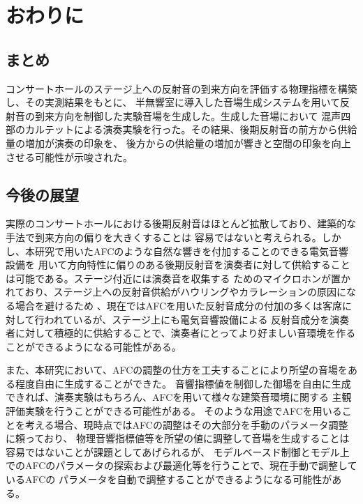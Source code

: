 \documentclass[11pt,a4j]{jreport}
\begin{document}
\chapter{おわりに}


\section{まとめ}

コンサートホールのステージ上への反射音の到来方向を評価する物理指標を構築し、その実測結果をもとに、
半無響室に導入した音場生成システムを用いて反射音の到来方向を制御した実験音場を生成した。生成した音場において
混声四部のカルテットによる演奏実験を行った。その結果、後期反射音の前方から供給量の増加が演奏の印象を、
後方からの供給量の増加が響きと空間の印象を向上させる可能性が示唆された。


\section{今後の展望}
実際のコンサートホールにおける後期反射音はほとんど拡散しており、建築的な手法で到来方向の偏りを大きくすることは
容易ではないと考えられる。しかし、本研究で用いたAFCのような自然な響きを付加することのできる電気音響設備を
用いて方向特性に偏りのある後期反射音を演奏者に対して供給することは可能である。ステージ付近には演奏音を収集する
ためのマイクロホンが置かれており、ステージ上への反射音供給がハウリングやカラレーションの原因になる場合を避けるため
、現在ではAFCを用いた反射音成分の付加の多くは客席に対して行われているが、ステージ上にも電気音響設備による
反射音成分を演奏者に対して積極的に供給することで、演奏者にとってより好ましい音環境を作ることができるようになる可能性がある。

また、本研究において、AFCの調整の仕方を工夫することにより所望の音場をある程度自由に生成することができた。
音響指標値を制御した御場を自由に生成できれば、演奏実験はもちろん、AFCを用いて様々な建築音環境に関する
主観評価実験を行うことができる可能性がある。
そのような用途でAFCを用いることを考える場合、現時点ではAFCの調整はその大部分を手動のパラメータ調整に頼っており、
物理音響指標値等を所望の値に調整して音場を生成することは容易ではないことが課題としてあげられるが、
モデルベースド制御とモデル上でのAFCのパラメータの探索および最適化等を行うことで、現在手動で調整しているAFCの
パラメータを自動で調整することができるようになる可能性がある。


\clearpage


\end{document}
